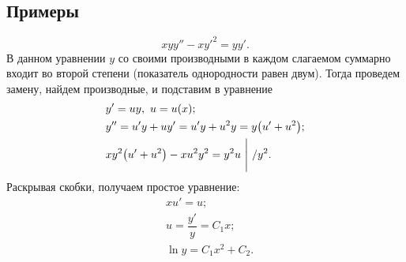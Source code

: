     \subsection{Примеры}

        \[
            xyy'' - x{y'}^2 = yy'.
        \]
        В данном уравнении $ y $ со своими производными в каждом слагаемом суммарно входит во второй степени (показатель однородности равен двум). Тогда проведем замену, найдем производные, и подставим в уравнение
        \[
            \begin{split}
                &y' = uy, ~ u = u(x); \\
                &y'' = u'y + uy' = u'y + u^2y = y\bigl( u' + u^2 \bigr); \\
                &xy^2 \bigl( u' + u^2 \bigr) -xu^2y^2 = y^2u ~ \Bigg| ~ /y^2.
            \end{split}
        \]
        Раскрывая скобки, получаем простое уравнение:
        \[
            \begin{split}
                &xu' = u; \\
                &u = \dfrac{y'}{y} = C_1 x; \\
                &\ln{y} = C_1 x^2 + C_2.
            \end{split}
        \]

